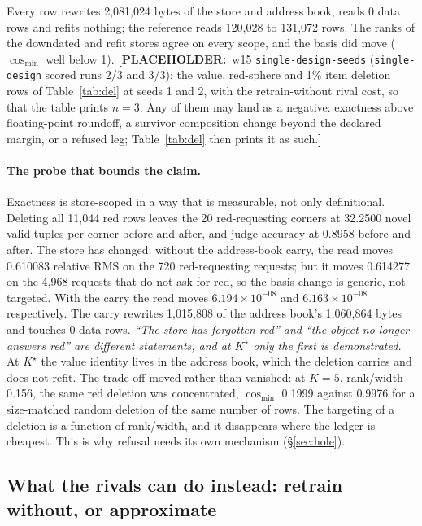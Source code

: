 \documentclass{article}
\newcommand{\PLACEHOLDER}[1]{{\color{red}\textbf{[PLACEHOLDER:}~#1\textbf{]}}}
\newcommand{\sci}[2]{\ensuremath{#1\times10^{#2}}}
\newcommand{\Kstar}{\ensuremath{K^{\star}}}
\begin{document}
\noindent Every row rewrites 2,081,024 bytes of the store and address book, reads 0 data rows
and refits nothing; the reference reads 120,028 to 131,072 rows.
The ranks of the downdated and refit stores agree on every scope, and the basis did move
($\cos_{\min}$ well below 1).
\PLACEHOLDER{w15 \texttt{single-design-seeds} (\texttt{single-design} scored runs 2/3 and 3/3):
the value, red-sphere and 1\% item deletion rows of Table~\ref{tab:del} at seeds 1 and 2, with
the retrain-without rival cost, so that the table prints $n=3$. Any of them may land as a
negative: exactness above floating-point roundoff, a survivor composition change beyond the
declared margin, or a refused leg; Table~\ref{tab:del} then prints it as such.}

\paragraph{The probe that bounds the claim.} Exactness is store-scoped in a way that is
measurable, not only definitional. Deleting all 11,044 red rows leaves the 20 red-requesting
corners at 32.2500 novel valid tuples per corner before and after, and judge accuracy at
0.8958 before and after.
The store has changed: without the address-book carry, the read moves 0.610083 relative RMS on
the 720 red-requesting requests; but it moves 0.614277 on the 4,968 requests that do not ask
for red, so the basis change is generic, not targeted. With the carry the read moves
\sci{6.194}{-08} and \sci{6.163}{-08} respectively. The carry rewrites 1,015,808 of the
address book's 1,060,864 bytes and touches 0 data rows.
\emph{``The store has forgotten red'' and ``the object no longer answers red'' are different
statements, and at $\Kstar$ only the first is demonstrated.} At $\Kstar$ the value identity
lives in the address book, which the deletion carries and does not refit. The trade-off moved
rather than vanished: at $K=5$, rank/width 0.156, the same red deletion was concentrated,
$\cos_{\min}$ 0.1999 against 0.9976 for a size-matched random deletion of the same number of
rows.
The targeting of a deletion is a function of rank/width, and it disappears where the ledger is
cheapest. This is why refusal needs its own mechanism (\S\ref{sec:hole}).

\subsection{What the rivals can do instead: retrain without, or approximate}
\label{sec:del-comparators}
\end{document}
